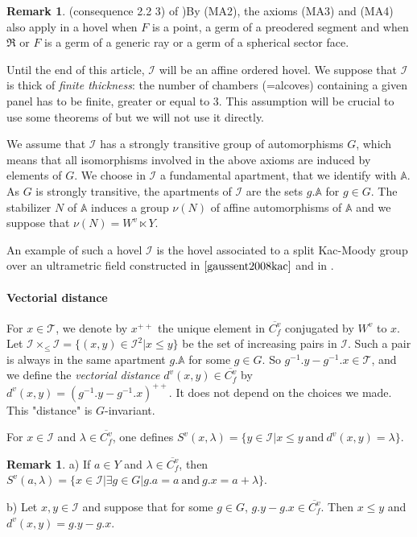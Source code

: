 \documentclass[12pt]{article}
\theoremstyle{plain}
\theoremstyle{definition}
\newtheorem{rque}[thm]{Remark}
\newcommand{\A}{\mathbb{A}}
\newcommand{\I}{\mathcal{I}}
\begin{document}
\begin{rque}(consequence 2.2 3) of \cite{rousseau2011masures})\label{rque axioms MA3 et MA4 modifiés}
By (MA2), the axioms (MA3) and (MA4) also apply in a hovel when $F$ is a point, a germ of a preodered segment and when $\mathfrak{R}$ or $F$ is a germ of a generic ray or a germ of a spherical sector face.
\end{rque}

\vspace{3mm}
Until the end of this article, $\I$ will be an affine ordered hovel. We suppose that $\I$ is thick of \textit{finite thickness}: the number of chambers (=alcoves) containing a given panel has to be finite, greater or equal to $3$. This assumption will be crucial to use some theorems of \cite{gaussent2014spherical} but we will not use it directly. 

We assume that $\I$ has a strongly transitive group of automorphisms $G$, which means that all isomorphisms involved in the above axioms are induced by elements of $G$. We choose in $\I$ a fundamental apartment, that we identify with $\A$. As $G$ is strongly transitive, the apartments of $\I$ are the sets $g.\A$ for $g\in G$. The stabilizer $N$ of $\A$ induces a group $\nu(N)$ of affine automorphisms of $\A$ and we suppose that $\nu(N)=W^v\ltimes Y$.

An example of such a hovel $\I$ is the hovel associated to a split Kac-Moody group over an ultrametric field constructed in $\cite{gaussent2008kac}$ and in \cite{rousseau2012almost}.

\paragraph{Vectorial distance}
For $x\in \mathcal{T}$, we denote by $x^{++}$ the unique element in $\overline{C^v_f}$ conjugated by $W^v$ to $x$. Let $\I\times_{\leq}\I=\{(x,y)\in \I^2|x\leq y\}$ be the set of increasing pairs in $\I$. Such a pair is always in the same apartment $g.\A$ for some $g\in G$. So $g^{-1}.y-g^{-1}.x\in \mathcal{T}$, and we define the \textit{vectorial distance} $d^v(x,y)\in\overline{C_f^v}$ by $d^v(x,y)=(g^{-1}.y-g^{-1}.x)^{++}$. It does not depend on the choices we made. This "distance" is $G$-invariant.

For $x\in \I$ and $\lambda\in \overline{C_f^v}$, one defines $S^v(x,\lambda)=\{y\in \I|x\leq y\mathrm{\ and\ }d^v(x,y)=\lambda\}$.

\begin{rque}\label{rque caractérisation distance vectorielle}
a) If $a\in Y$ and $\lambda\in \overline{C_f^v}$, then $S^v(a,\lambda)=\{x\in \I|\exists g\in G|g.a=a\mathrm{\ and\ }g.x=a+\lambda\}$.

b) Let $x,y\in \I$ and suppose that for some $g\in G$, $g.y-g.x\in \overline{C_f^v}$. Then $x\leq y$ and $d^v(x,y)=g.y-g.x$.


\end{rque}
\end{document}
